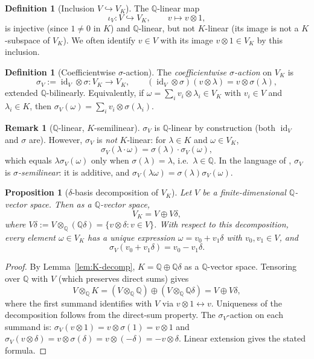 \documentclass[11pt, a4paper]{amsart}
\newtheorem{proposition}[theorem]{Proposition}
\theoremstyle{definition}
\newtheorem{definition}[theorem]{Definition}
\newtheorem{remark}[theorem]{Remark}
\newcommand{\Q}{\mathbb{Q}}
\newcommand{\id}{\operatorname{id}}
\begin{document}
\begin{definition}[Inclusion $V \hookrightarrow V_K$]
\label{def:inclusion}
The $\Q$-linear map
\[
  \iota_V \colon V \hookrightarrow V_K,
  \qquad v \mapsto v \otimes 1,
\]
is injective (since $1 \neq 0$ in $K$) and $\Q$-linear, but not
$K$-linear (its image is not a $K$-subspace of $V_K$). We often
identify $v \in V$ with its image $v \otimes 1 \in V_K$ by this
inclusion.
\end{definition}

\begin{definition}[Coefficientwise $\sigma$-action]
\label{def:sigmaV}
The \emph{coefficientwise $\sigma$-action} on $V_K$ is
\[
  \sigma_V := \id_V \otimes \sigma \colon V_K \to V_K,
  \qquad (\id_V \otimes \sigma)(v \otimes \lambda)
  = v \otimes \sigma(\lambda),
\]
extended $\Q$-bilinearly. Equivalently, if $\omega = \sum_i v_i
\otimes \lambda_i \in V_K$ with $v_i \in V$ and $\lambda_i \in K$,
then $\sigma_V(\omega) = \sum_i v_i \otimes \sigma(\lambda_i)$.
\end{definition}

\begin{remark}[$\Q$-linear, $K$-semilinear]
\label{rmk:semilinear}
$\sigma_V$ is $\Q$-linear by construction (both $\id_V$ and $\sigma$
are). However, $\sigma_V$ is \emph{not} $K$-linear: for $\lambda
\in K$ and $\omega \in V_K$,
\[
  \sigma_V(\lambda \cdot \omega) = \sigma(\lambda) \cdot \sigma_V(\omega),
\]
which equals $\lambda \sigma_V(\omega)$ only when $\sigma(\lambda)
= \lambda$, i.e.\ $\lambda \in \Q$. In the language of
\cite[Ch.~XVI \S 7]{LangAlgebra}, $\sigma_V$ is \emph{$\sigma$-semilinear}:
it is additive, and $\sigma_V(\lambda \omega) = \sigma(\lambda)
\sigma_V(\omega)$.
\end{remark}

\begin{proposition}[$\delta$-basis decomposition of $V_K$]
\label{prop:VK-decomp}
Let $V$ be a finite-dimensional $\Q$-vector space. Then as a
$\Q$-vector space,
\[
  V_K = V \oplus V\delta,
\]
where $V\delta := V \otimes_\Q (\Q\delta) = \{v \otimes \delta : v
\in V\}$. With respect to this decomposition, every element
$\omega \in V_K$ has a unique expression $\omega = v_0 + v_1\delta$
with $v_0, v_1 \in V$, and
\[
  \sigma_V(v_0 + v_1\delta) = v_0 - v_1\delta.
\]
\end{proposition}

\begin{proof}
By Lemma~\ref{lem:K-decomp}, $K = \Q \oplus \Q\delta$ as a
$\Q$-vector space. Tensoring over $\Q$ with $V$ (which preserves
direct sums) gives
\[
  V \otimes_\Q K = (V \otimes_\Q \Q) \oplus (V \otimes_\Q \Q\delta)
  = V \oplus V\delta,
\]
where the first summand identifies with $V$ via $v \otimes 1
\leftrightarrow v$. Uniqueness of the decomposition follows from
the direct-sum property. The $\sigma_V$-action on each summand is:
$\sigma_V(v \otimes 1) = v \otimes \sigma(1) = v \otimes 1$ and
$\sigma_V(v \otimes \delta) = v \otimes \sigma(\delta) = v \otimes
(-\delta) = -v \otimes \delta$. Linear extension gives the stated
formula.
\end{proof}
\end{document}
